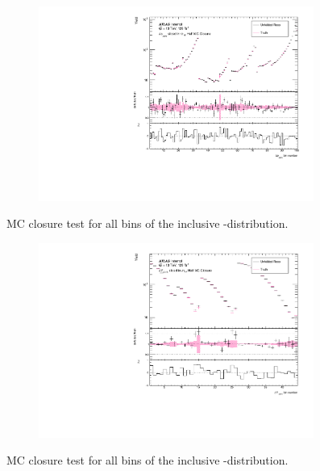 \begin{figure}[htb]
  \centering
  \begin{subfigure}{.65\textwidth}\centering\includegraphics[width = 0.99\textwidth]{Figures/m4l/UnfoldingStudies/v014_closure/HalfMCClosure_withPull_deltaPhiPairs_m4l.pdf}\end{subfigure}
\caption{MC closure test for all bins of the inclusive \dPhiPairs-\mFourL distribution.}
 \end{figure}

\begin{figure}[htb]
  \centering
  \begin{subfigure}{.65\textwidth}\centering\includegraphics[width = 0.99\textwidth]{Figures/m4l/UnfoldingStudies/v014_closure/HalfMCClosure_withPull_deltaYPairs_m4l.pdf}\end{subfigure}
\caption{MC closure test for all bins of the inclusive \dYPairs-\mFourL distribution.}
 \end{figure}

